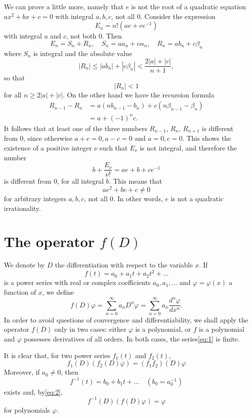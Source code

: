 We can prove a little more, namely that $e$ is not the root of a quadratic equation $ax^2 + bx + c = 0$ with integral $a, b, c$, not all 0. Consider the expression
\[ E_n = n! (ae + ce^{-1}) \]
with integral $a$ and $c$, not both 0. Then
\[ E_n = S_n + R_n, \quad S_n = a a_n + c \alpha_n, \quad R_n = a b_n + c \beta_n \]
where $S_n$ is integral and the absolute value
\[ |R_n| \leq |ab_n| + |c\beta_n| < \frac{2|a|+|c|}{n+1}, \]
so that
\[ |R_n| < 1 \]
for all $n \ge 2|a|+|c|$. On the other hand we have the recursion formula
\[ \begin{aligned} R_{n-1} - R_n &= a(nb_{n-1} - b_n) + c(n\beta_{n-1} - \beta_n) \\ &= a + (-1)^{n}c. \end{aligned} \]
It follows that at least one of the three numbers $R_{n-1}$, $R_n$, $R_{n+1}$ is different from 0, since otherwise $a+c=0, a-c=0$ and $a=0, c=0$. This shows the existence of a positive integer $\nu$ such that $E_{\nu}$ is not integral, and therefore the number
\[ b + \frac{E_{\nu}}{\nu!} = ae + b + ce^{-1} \]
is different from 0, for all integral $b$. This means that
\[ ae^2 + be + c \neq 0 \]
for arbitrary integers $a, b, c$, not all 0. In other words, $e$ is not a quadratic irrationality.

\section{The operator $f(D)$}

We denote by $D$ the differentiation with respect to the variable $x$. If
\[ f(t) = a_0 + a_1 t + a_2 t^2 + \dots \]
is a power series with real or complex coefficients $a_0, a_1, \dots$ and $\varphi = \varphi(x)$ a function of $x$, we define
\begin{equation} f(D)\varphi = \sum_{n=0}^{\infty} a_n D^n \varphi = \sum_{n=0}^{\infty} a_n \frac{d^n \varphi}{dx^n}. \tag{1}\label{eq:1} \end{equation}
In order to avoid questions of convergence and differentiability, we shall apply the operator $f(D)$ only in two cases: either $\varphi$ is a polynomial, or $f$ is a polynomial and $\varphi$ possesses derivatives of all orders. In both cases, the series\eqref{eq:1} is finite.

It is clear that, for two power series $f_1(t)$ and $f_2(t)$,
\begin{equation} f_1(D)(f_2(D)\varphi) = (f_1 f_2)(D)\varphi \tag{2}\label{eq:2} \end{equation}
Moreover, if $a_0 \neq 0$, then
\[ f^{-1}(t) = b_0 + b_1 t + \dots \quad (b_0 = a_0^{-1}) \]
exists and, by\eqref{eq:2},
\[ f^{-1}(D)(f(D)\varphi) = \varphi \]
for polynomials $\varphi$.

